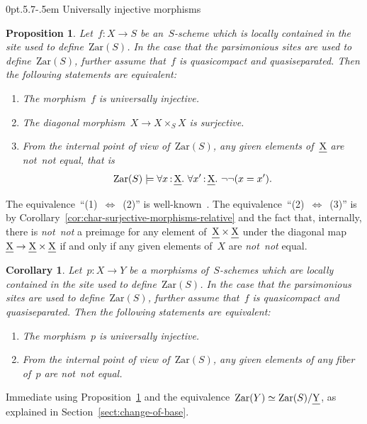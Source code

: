 \documentclass[10pt,reqno,a4paper]{amsbook}
\makeatletter
\theoremstyle{definition}
\theoremstyle{plain}
\newtheorem{prop}[defn]{Proposition}
\newtheorem{cor}[defn]{Corollary}
\theoremstyle{remark}
\let\oldul\ul
\renewcommand{\ul}[1]{\text{\oldul{$#1$}}}
\newcommand{\Zar}{\mathrm{Zar}}
\newcommand{\?}{\,{:}\,}
\renewcommand{\_}{\mathpunct{.}\,}
\newcommand{\notnot}{\emph{not~not}\xspace}
\newcommand{\stacksproject}[1]{\cite[{\href{https://stacks.math.columbia.edu/tag/#1}{Tag~#1}}]{stacks-project}}
\renewenvironment{proof}[1][\proofname]{\par
  \pushQED{\qed}%
  \normalfont \topsep6\p@\@plus6\p@\relax
  \trivlist
  \item[\hskip\labelsep
        \itshape
    #1\@addpunct{.}]\ignorespaces
}{%
  \popQED\endtrivlist\@endpefalse
}
\def\subsection{\@startsection{subsection}{2}%
  {0pt}{.5\linespacing\@plus.7\linespacing}{-.5em}%
  {\normalfont\bfseries}}
\makeatother
\begin{document}
\subsection{Universally injective morphisms}

\begin{prop}\label{prop:char-univ-injective-morphisms}
Let~$f : X \to S$ be an~$S$-scheme which is locally contained in the site
used to define~$\Zar(S)$. In the case that the parsimonious sites are used to
define~$\Zar(S)$, further assume that~$f$ is quasicompact and quasiseparated.
Then the following statements are equivalent:
\begin{enumerate}
\item The morphism~$f$ is universally injective.
\item The diagonal morphism~$X \to X \times_S X$ is surjective.
\item From the internal point of view of~$\Zar(S)$, any given elements of~$\ul{X}$
are \notnot equal, that is
\[ \Zar(S) \models \forall x\?\ul{X}\_ \forall x'\?\ul{X}\_ \neg\neg(x = x'). \]
\end{enumerate}
\end{prop}

\begin{proof}The equivalence~``(1)~$\Leftrightarrow$~(2)'' is
well-known~\stacksproject{01S4}. The equivalence~``(2)~$\Leftrightarrow$~(3)''
is by Corollary~\ref{cor:char-surjective-morphisms-relative} and the fact that,
internally, there is \notnot a preimage for any element of~$\ul{X} \times
\ul{X}$ under the diagonal map~$\ul{X} \to \ul{X} \times \ul{X}$ if and only if
any given elements of~$X$ are \notnot equal.
\end{proof}

\begin{cor}Let~$p : X \to Y$ be a morphisms of~$S$-schemes which are locally
contained in the site used to define~$\Zar(S)$. In the case that the
parsimonious sites are used to define~$\Zar(S)$, further assume that~$f$ is
quasicompact and quasiseparated. Then the following statements
are equivalent:
\begin{enumerate}
\item The morphism~$p$ is universally injective.
\item From the internal point of view of~$\Zar(S)$, any given elements of any
fiber of~$p$ are \notnot equal.
\end{enumerate}
\end{cor}

\begin{proof}Immediate using Proposition~\ref{prop:char-univ-injective-morphisms}
and the equivalence~$\Zar(Y) \simeq \Zar(S)/\ul{Y}$,
as explained in Section~\ref{sect:change-of-base}.
\end{proof}
\end{document}
